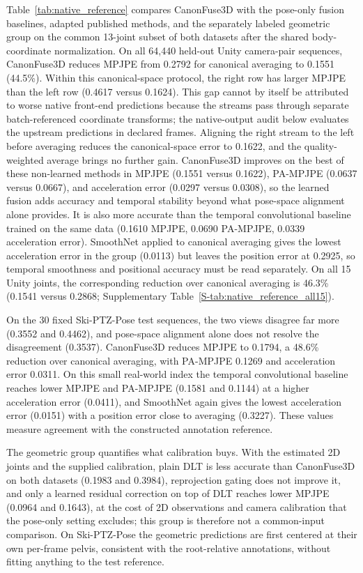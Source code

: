 \documentclass[preprint,12pt]{elsarticle}
\begin{document}
Table~\ref{tab:native_reference} compares CanonFuse3D with the pose-only fusion baselines, adapted published methods, and the separately labeled geometric group on the common 13-joint subset of both datasets after the shared body-coordinate normalization. On all 64,440 held-out Unity camera-pair sequences, CanonFuse3D reduces MPJPE from 0.2792 for canonical averaging to 0.1551 (44.5\%). Within this canonical-space protocol, the right row has larger MPJPE than the left row (0.4617 versus 0.1624). This gap cannot by itself be attributed to worse native front-end predictions because the streams pass through separate batch-referenced coordinate transforms; the native-output audit below evaluates the upstream predictions in declared frames. Aligning the right stream to the left before averaging reduces the canonical-space error to 0.1622, and the quality-weighted average brings no further gain. CanonFuse3D improves on the best of these non-learned methods in MPJPE (0.1551 versus 0.1622), PA-MPJPE (0.0637 versus 0.0667), and acceleration error (0.0297 versus 0.0308), so the learned fusion adds accuracy and temporal stability beyond what pose-space alignment alone provides. It is also more accurate than the temporal convolutional baseline trained on the same data (0.1610 MPJPE, 0.0690 PA-MPJPE, 0.0339 acceleration error). SmoothNet applied to canonical averaging gives the lowest acceleration error in the group (0.0113) but leaves the position error at 0.2925, so temporal smoothness and positional accuracy must be read separately. On all 15 Unity joints, the corresponding reduction over canonical averaging is 46.3\% (0.1541 versus 0.2868; Supplementary Table~\ref{S-tab:native_reference_all15}).

On the 30 fixed Ski-PTZ-Pose test sequences, the two views disagree far more (0.3552 and 0.4462), and pose-space alignment alone does not resolve the disagreement (0.3537). CanonFuse3D reduces MPJPE to 0.1794, a 48.6\% reduction over canonical averaging, with PA-MPJPE 0.1269 and acceleration error 0.0311. On this small real-world index the temporal convolutional baseline reaches lower MPJPE and PA-MPJPE (0.1581 and 0.1144) at a higher acceleration error (0.0411), and SmoothNet again gives the lowest acceleration error (0.0151) with a position error close to averaging (0.3227). These values measure agreement with the constructed annotation reference.

The geometric group quantifies what calibration buys. With the estimated 2D joints and the supplied calibration, plain DLT is less accurate than CanonFuse3D on both datasets (0.1983 and 0.3984), reprojection gating does not improve it, and only a learned residual correction on top of DLT reaches lower MPJPE (0.0964 and 0.1643), at the cost of 2D observations and camera calibration that the pose-only setting excludes; this group is therefore not a common-input comparison. On Ski-PTZ-Pose the geometric predictions are first centered at their own per-frame pelvis, consistent with the root-relative annotations, without fitting anything to the test reference.
\end{document}
